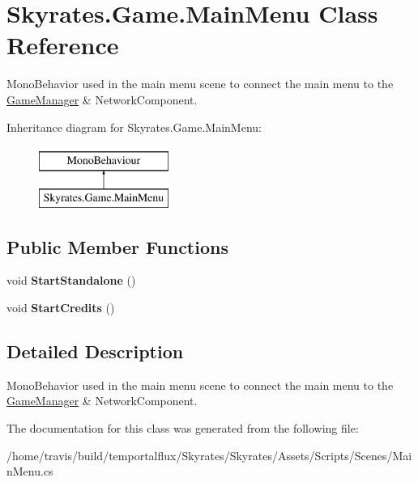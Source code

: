 \hypertarget{class_skyrates_1_1_game_1_1_main_menu}{\section{Skyrates.\-Game.\-Main\-Menu Class Reference}
\label{class_skyrates_1_1_game_1_1_main_menu}
}


Mono\-Behavior used in the main menu scene to connect the main menu to the \hyperlink{class_skyrates_1_1_game_1_1_game_manager}{Game\-Manager} \& Network\-Component.  


Inheritance diagram for Skyrates.\-Game.\-Main\-Menu\-:\begin{figure}[H]
\begin{center}
\leavevmode
\includegraphics[height=2.000000cm]{class_skyrates_1_1_game_1_1_main_menu}
\end{center}
\end{figure}
\subsection*{Public Member Functions}
\begin{DoxyCompactItemize}
\item 
\hypertarget{class_skyrates_1_1_game_1_1_main_menu_a91c5313ef17339c0cec70fbada0217ec}{void {\bfseries Start\-Standalone} ()}\label{class_skyrates_1_1_game_1_1_main_menu_a91c5313ef17339c0cec70fbada0217ec}

\item 
\hypertarget{class_skyrates_1_1_game_1_1_main_menu_aebe1cbed6833b7f7eeeecd87bdff5d59}{void {\bfseries Start\-Credits} ()}\label{class_skyrates_1_1_game_1_1_main_menu_aebe1cbed6833b7f7eeeecd87bdff5d59}

\end{DoxyCompactItemize}


\subsection{Detailed Description}
Mono\-Behavior used in the main menu scene to connect the main menu to the \hyperlink{class_skyrates_1_1_game_1_1_game_manager}{Game\-Manager} \& Network\-Component. 



The documentation for this class was generated from the following file\-:\begin{DoxyCompactItemize}
\item 
/home/travis/build/temportalflux/\-Skyrates/\-Skyrates/\-Assets/\-Scripts/\-Scenes/Main\-Menu.\-cs\end{DoxyCompactItemize}
